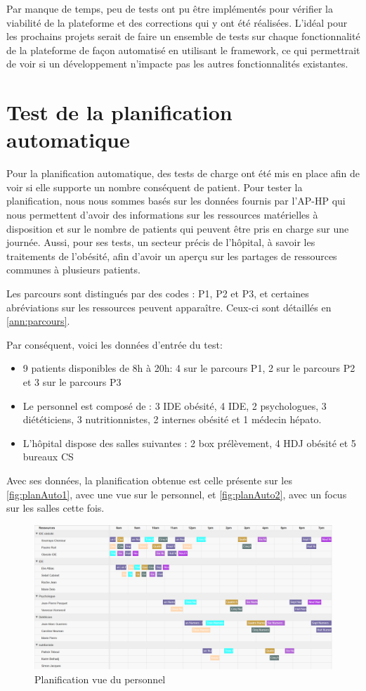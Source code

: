 \documentclass[noposter]{polytech/polytech}
\begin{document}
Par manque de temps, peu de tests ont pu être implémentés pour vérifier la viabilité de la plateforme et des corrections qui y ont été réalisées. L'idéal pour les prochains projets serait de faire un ensemble de tests sur chaque fonctionnalité de la plateforme de façon automatisé en utilisant le framework, ce qui permettrait de voir si un développement n'impacte pas les autres fonctionnalités existantes. 

\section{Test de la planification automatique}

Pour la planification automatique, des tests de charge ont été mis en place afin de voir si elle supporte un nombre conséquent de patient. Pour tester la planification, nous nous sommes basés sur les données fournis par l'AP-HP qui nous permettent d'avoir des informations sur les ressources matérielles à disposition et sur le nombre de patients qui peuvent être pris en charge sur une journée. Aussi, pour ses tests, un secteur précis de l'hôpital, à savoir les traitements de l'obésité, afin d'avoir un aperçu sur les partages de ressources communes à plusieurs patients. 

Les parcours sont distingués par des codes : P1, P2 et P3, et certaines abréviations sur les ressources peuvent apparaître. Ceux-ci sont détaillés en \autoref{ann:parcours}.

Par conséquent, voici les données d'entrée du test:

\begin{itemize}
	\item 9 patients disponibles de 8h à 20h: 4 sur le parcours P1, 2 sur le parcours P2 et 3 sur le parcours P3
	\item Le personnel est composé de : 3 IDE obésité, 4 IDE, 2 psychologues, 3 diététiciens, 3 nutritionnistes, 2 internes obésité et 1 médecin hépato.
	\item L'hôpital dispose des salles suivantes : 2 box prélèvement, 4 HDJ obésité et 5 bureaux CS
\end{itemize}

Avec ses données, la planification obtenue est celle présente sur les \autoref{fig:planAuto1}, avec une vue sur le personnel, et \autoref{fig:planAuto2}, avec un focus sur les salles cette fois.

\begin{figure}
	\includegraphics[scale=0.25]{images/planAuto1}
	\caption{Planification vue du personnel}
	\label{fig:planAuto1}
\end{figure}
\end{document}
